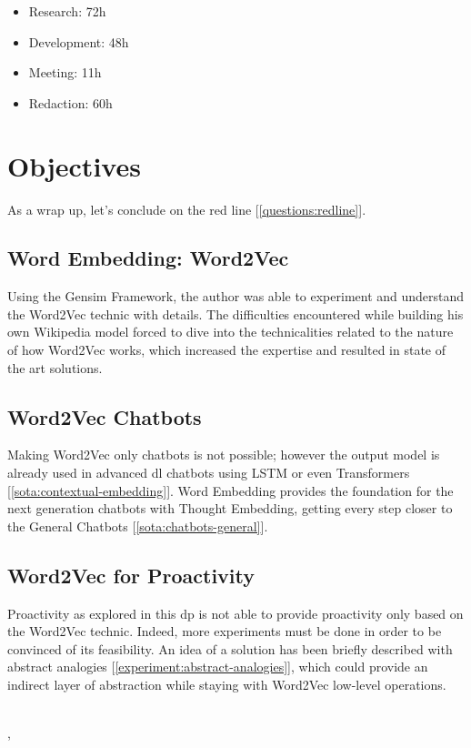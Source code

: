 \begin{itemize}
\setlength\itemsep{0em}
    \item Research: 72h
    \item Development: 48h
    \item Meeting: 11h
    \item Redaction: 60h
\end{itemize}


\section{Objectives}
As a wrap up, let's conclude on the red line [\ref{questions:redline}].

\subsection{Word Embedding: Word2Vec}
Using the Gensim Framework, the author was able to experiment and understand the Word2Vec technic with details. The difficulties encountered while building his own Wikipedia model forced to dive into the technicalities related to the nature of how Word2Vec works, which increased the expertise and resulted in state of the art solutions.

\subsection{Word2Vec Chatbots}
Making Word2Vec only chatbots is not possible; however the output model is already used in advanced \gls{dl} chatbots using LSTM or even Transformers [\ref{sota:contextual-embedding}]. Word Embedding provides the foundation for the next generation chatbots with Thought Embedding, getting every step closer to the General Chatbots [\ref{sota:chatbots-general}].


\subsection{Word2Vec for Proactivity}
Proactivity as explored in this \gls{dp} is not able to provide proactivity only based on the Word2Vec technic. Indeed, more experiments must be done in order to be convinced of its feasibility. An idea of a solution has been briefly described with abstract analogies [\ref{experiment:abstract-analogies}], which could provide an indirect layer of abstraction while staying with Word2Vec low-level operations.


~\\[5cm]
\Locality, \Date
~\\[1cm]
\Author